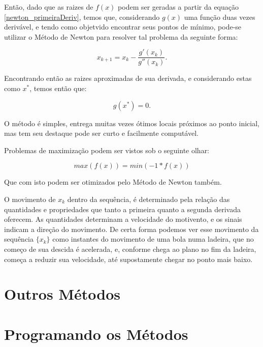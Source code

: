 
Então, dado que as raizes de $f(x)$ podem ser geradas a partir da equação
\ref{newton_primeiraDeriv}, temos que, considerando $g(x)$ uma função duas vezes
derivável, e tendo como objetvido encontrar seus pontos de mínimo, pode-se
utilizar o Método de Newton para resolver tal problema da seguinte forma:

\begin{equation}
    x_{k+1} = x_{k} - \frac {g'(x_{k})}{g''(x_{k})}.
\end{equation}

Encontrando então as raizes aproximadas de sua derivada, e considerando
estas como  $x^*$, temos então que:

\begin{equation}
    g(x^*) = 0.
\end{equation}

O método é simples, entrega muitas vezes ótimos locais próximos ao ponto
inicial, mas tem seu destaque pode ser curto e facilmente computável.

Problemas de maximização podem ser vistos sob o seguinte olhar:

\begin{equation}
    max(f(x)) = min(-1 * f(x))
\end{equation}

Que com isto podem ser otimizados pelo Método de Newton também.

O movimento de \(x_k\) dentro da sequência, é determinado pela relação das
quantidades e propriedades que tanto a primeira quanto a segunda derivada
oferecem. As quantidades determinam a velocidade do motivento, e os sinais
indicam a direção do movimento. De certa forma podemos ver esse movimento da
sequência \(\{x_k\}\) como instantes do movimento de uma bola numa ladeira, que
no começo de sua descida é acelerada, e, conforme chega ao plano no fim da
ladeira, começa a reduzir sua velocidade, até supostamente chegar no ponto mais
baixo.


\section{{Outros Métodos}}

\hspace{0.8cm}

\section{{Programando os Métodos}}

